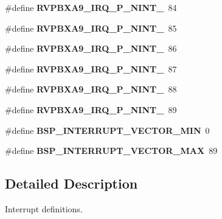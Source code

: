 \begin{DoxyCompactItemize}
\#define {\bfseries R\+V\+P\+B\+X\+A9\+\_\+\+I\+R\+Q\+\_\+\+P\+\_\+\+N\+I\+N\+T\+\_}~84
\item 
\mbox{\label{bsps_2arm_2realview-pbx-a9_2include_2bsp_2irq_8h_af3fa67d0704684b3823f3f07d28d1e36}} 
\#define {\bfseries R\+V\+P\+B\+X\+A9\+\_\+\+I\+R\+Q\+\_\+\+P\+\_\+\+N\+I\+N\+T\+\_}~85
\item 
\mbox{\label{bsps_2arm_2realview-pbx-a9_2include_2bsp_2irq_8h_acaf819a1752b05ada981a31ebf979530}} 
\#define {\bfseries R\+V\+P\+B\+X\+A9\+\_\+\+I\+R\+Q\+\_\+\+P\+\_\+\+N\+I\+N\+T\+\_}~86
\item 
\mbox{\label{bsps_2arm_2realview-pbx-a9_2include_2bsp_2irq_8h_af9d9e1ec82b4d0b000857020ce9b58f9}} 
\#define {\bfseries R\+V\+P\+B\+X\+A9\+\_\+\+I\+R\+Q\+\_\+\+P\+\_\+\+N\+I\+N\+T\+\_}~87
\item 
\mbox{\label{bsps_2arm_2realview-pbx-a9_2include_2bsp_2irq_8h_abdd3db40bc9ef744537273d2a9efb5bd}} 
\#define {\bfseries R\+V\+P\+B\+X\+A9\+\_\+\+I\+R\+Q\+\_\+\+P\+\_\+\+N\+I\+N\+T\+\_}~88
\item 
\mbox{\label{bsps_2arm_2realview-pbx-a9_2include_2bsp_2irq_8h_acfee873b3da05d66f7e50ea5b53b6676}} 
\#define {\bfseries R\+V\+P\+B\+X\+A9\+\_\+\+I\+R\+Q\+\_\+\+P\+\_\+\+N\+I\+N\+T\+\_}~89
\item 
\mbox{\label{bsps_2arm_2realview-pbx-a9_2include_2bsp_2irq_8h_a64cbb02dfea4d6923abccaa0087d2a0d}} 
\#define {\bfseries B\+S\+P\+\_\+\+I\+N\+T\+E\+R\+R\+U\+P\+T\+\_\+\+V\+E\+C\+T\+O\+R\+\_\+\+M\+IN}~0
\item 
\mbox{\label{bsps_2arm_2realview-pbx-a9_2include_2bsp_2irq_8h_ae4a2cdda5816a4c83c2fac0a49880c6e}} 
\#define {\bfseries B\+S\+P\+\_\+\+I\+N\+T\+E\+R\+R\+U\+P\+T\+\_\+\+V\+E\+C\+T\+O\+R\+\_\+\+M\+AX}~89
\end{DoxyCompactItemize}


\subsection{Detailed Description}
Interrupt definitions. 

